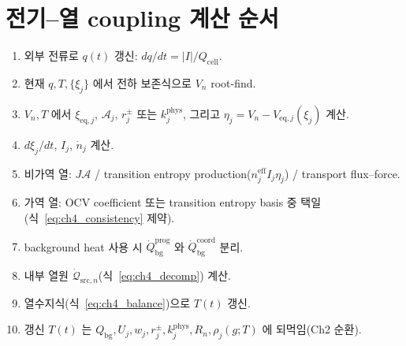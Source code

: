 \documentclass[11pt,a4paper]{article}
\newcommand{\eff}{\mathrm{eff}}
\newcommand{\eq}{\mathrm{eq}}
\newcommand{\bg}{\mathrm{bg}}
\newcommand{\cell}{\mathrm{cell}}
\newcommand{\src}{\mathrm{src}}
\newcommand{\prog}{\mathrm{prog}}
\newcommand{\coord}{\mathrm{coord}}
\begin{document}
\section{전기--열 coupling 계산 순서}\label{sec:ch4_order}
\begin{enumerate}[label=\arabic*),leftmargin=2.0em]
\item 외부 전류로 $q(t)$ 갱신: $dq/dt=|I|/Q_\cell$.
\item 현재 $q,T,\{\xi_j\}$ 에서 전하 보존식으로 $V_n$ root-find.
\item $V_n,T$ 에서 $\xi_{\eq,j}$, $\mathcal A_j$, $r_j^\pm$ 또는 $k_j^{\mathrm{phys}}$, 그리고 $\eta_j=V_n-V_{\eq,j}(\xi_j)$ 계산.
\item $d\xi_j/dt$, $I_j$, $\dot n_j$ 계산.
\item 비가역 열: $J\mathcal A$ / transition entropy production($n_j^{\eff}I_j\eta_j$) / transport flux--force.
\item 가역 열: OCV coefficient 또는 transition entropy basis 중 택일(식~\eqref{eq:ch4_consistency} 제약).
\item background heat 사용 시 $\dot Q_\bg^{\prog}$ 와 $\dot Q_\bg^{\coord}$ 분리.
\item 내부 열원 $\dot{\mathcal Q}_{\src,n}$(식~\eqref{eq:ch4_decomp}) 계산.
\item 열수지식(식~\eqref{eq:ch4_balance})으로 $T(t)$ 갱신.
\item 갱신 $T(t)$ 는 $Q_\bg,U_j,w_j,r_j^\pm,k_j^{\mathrm{phys}},R_n,\rho_j(g;T)$ 에 되먹임(Ch2 순환).
\end{enumerate}

\end{document}
